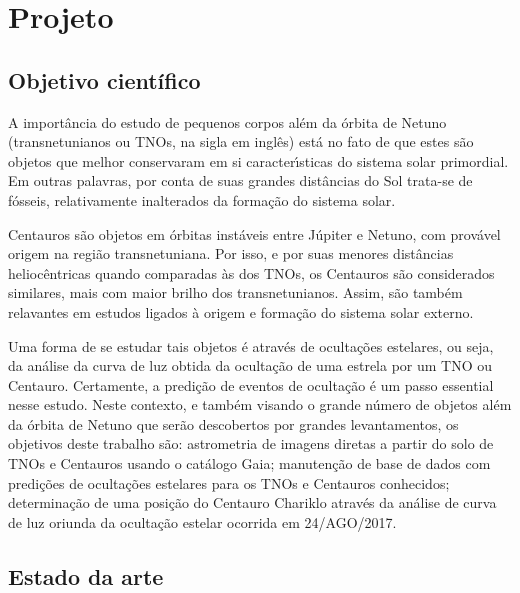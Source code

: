 \documentclass[a4paper, 11pt]{article}
\begin{document}
\renewcommand{\figurename}{\textsc{Figura}}
\renewcommand{\tablename}{\textsc{Tabela}}
\renewcommand{\refname}{Refer\^encias}




\section{Projeto}

\subsection{Objetivo científico}

A importância do estudo de pequenos corpos al\'em da \'orbita de Netuno (transnetunianos ou TNOs, na sigla em ingl\^es) est\'a no fato de que estes s\~ao objetos que melhor conservaram em si caracter\'{\i}sticas do sistema solar primordial. Em outras palavras, por conta de suas grandes dist\^ancias do Sol trata-se de f\'osseis, relativamente inalterados da forma\c c\~ao do sistema solar.

Centauros s\~ao objetos em \'orbitas inst\'aveis entre J\'upiter e Netuno, com prov\'avel origem na regi\~ao transnetuniana. Por isso, e por suas menores dist\^ancias helioc\^entricas quando comparadas \`as dos TNOs, os Centauros s\~ao considerados similares, mais com maior brilho dos transnetunianos. Assim, s\~ao tamb\'em relavantes em estudos ligados \`a origem e forma\c c\~ao do sistema solar externo.

Uma forma de se estudar tais objetos \'e atrav\'es de oculta\c c\~oes estelares, ou seja, da an\'alise da curva de luz obtida da oculta\c c\~ao de uma estrela por um TNO ou Centauro. Certamente, a predi\c c\~ao de eventos de oculta\c c\~ao \'e um passo essential nesse estudo. Neste contexto, e tamb\'em visando o grande n\'umero de objetos al\'em da \'orbita de Netuno que ser\~ao descobertos por grandes levantamentos, os objetivos deste trabalho s\~ao: astrometria de imagens diretas a partir do solo de TNOs e Centauros usando o cat\'alogo Gaia; manuten\c c\~ao de base de dados com predi\c c\~oes de oculta\c c\~oes estelares para os TNOs e Centauros conhecidos; determina\c c\~ao de uma posi\c c\~ao do Centauro Chariklo atrav\'es da an\'alise de curva de luz oriunda da  oculta\c c\~ao estelar ocorrida em 24/AGO/2017.

\subsection{Estado da arte}
\end{document}

